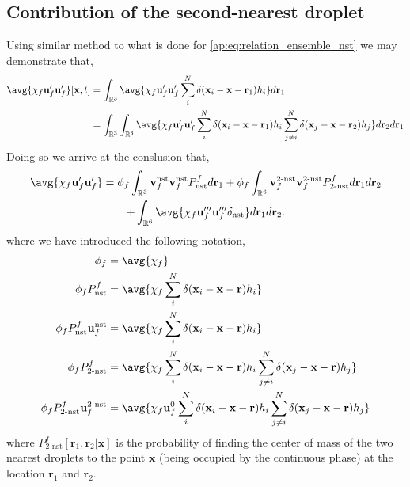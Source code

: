 \subsection{Contribution of the second-nearest droplet}

Using similar method to what is done for \ref{ap:eq:relation_ensemble_nst} we may demonstrate that,  
\begin{align*}
    \avg{\chi_f \textbf{u}_f'\textbf{u}_f'}[\textbf{x},t]
    &= 
    \int_{\mathbb{R}^3}
    \avg{\chi_f \textbf{u}_f'\textbf{u}_f' 
    \sum_i^N \delta(\textbf{x}_i - \textbf{x}- \textbf{r}_1)
    h_i
    }
    d\textbf{r}_1\\
    &= 
    \int_{\mathbb{R}^3}
    \int_{\mathbb{R}^3}
    \avg{\chi_f \textbf{u}_f'\textbf{u}_f' 
    \sum_i^N \delta(\textbf{x}_i - \textbf{x}- \textbf{r}_1)
    h_i
    \sum_{j\neq i}^N \delta(\textbf{x}_j - \textbf{x}- \textbf{r}_2)
    h_j
    }
    d\textbf{r}_2
    d\textbf{r}_1
\end{align*}
Doing so we arrive at the conslusion that, 
\begin{multline}
    \avg{\chi_f \textbf{u}_f'\textbf{u}_f'}
    = 
    \phi_f
    \int_{\mathbb{R}^3}
    \textbf{v}_f^\text{nst}
    \textbf{v}_f^\text{nst}
    P_\text{nst}^f
    d\textbf{r}_1
    + 
    \phi_f
    \int_{\mathbb{R}^6}
    \textbf{v}_f^\text{2-nst}
    \textbf{v}_f^\text{2-nst}
    P_\text{2-nst}^f
    d\textbf{r}_1
    d\textbf{r}_2 \\
    + 
    \int_{\mathbb{R}^6}
    \avg{
        \chi_f
        \textbf{u}_f'''
        \textbf{u}_f'''
        \delta_\text{nst}
    }
    d\textbf{r}_1
    d\textbf{r}_2.
\end{multline}
where we have introduced the following notation, 
\begin{align}
    \phi_f
    &= 
    \avg{\chi_f}\\
    \phi_f P_\text{nst}^f 
    &= 
    \avg{\chi_f  
    \sum_i^N \delta(\textbf{x}_i - \textbf{x}- \textbf{r})
    h_i
    }\\
    \phi_f P_\text{nst}^f \textbf{u}_f^\text{nst}
    &= 
    \avg{\chi_f  
    \sum_i^N \delta(\textbf{x}_i - \textbf{x}- \textbf{r})
    h_i
    }\\
    \phi_f P_\text{2-nst}^f
    &= 
    \avg{\chi_f  
    \sum_i^N \delta(\textbf{x}_i - \textbf{x}- \textbf{r})
    h_i
    \sum_{j\neq i}^N \delta(\textbf{x}_j - \textbf{x}- \textbf{r})
    h_j
    }\\
    \phi_f P_\text{2-nst}^f \textbf{u}_f^\text{2-nst}
    &= 
    \avg{\chi_f \textbf{u}_f^0 
    \sum_i^N \delta(\textbf{x}_i - \textbf{x}- \textbf{r})
    h_i
    \sum_{j\neq i}^N \delta(\textbf{x}_j - \textbf{x}- \textbf{r})
    h_j
    }
\end{align}
where $P_\text{2-nst}^f[\textbf{r}_1, \textbf{r}_2|\textbf{x}]$ is the probability of finding the center of mass of the two nearest droplets to the point $\textbf{x}$ (being occupied by the continuous phase) at the location $\textbf{r}_1$ and $\textbf{r}_2$.  

